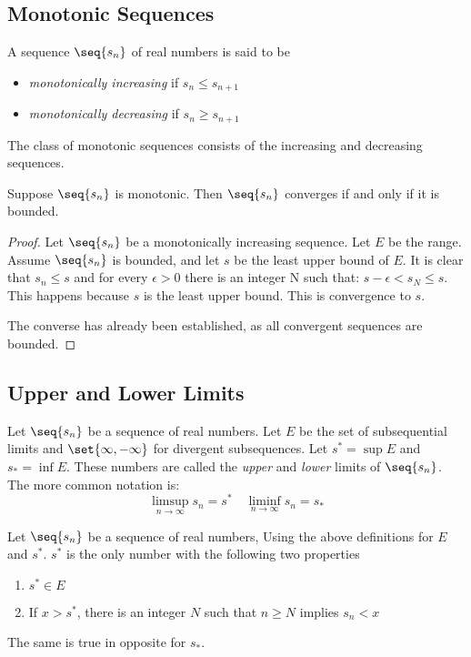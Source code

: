 \documentclass[12pt, letterpaper]{paper}
\begin{document}
\subsection{Monotonic Sequences}
\label{sec:org803e73d}

A sequence $\seq{s_n}$ of real numbers is said to be
\begin{itemize}
\item \emph{monotonically increasing} if $s_n \leq s_{n+1}$
\item \emph{monotonically decreasing} if $s_n \geq s_{n+1}$
\end{itemize}

The class of monotonic sequences consists of the increasing and
decreasing sequences.

\begin{theorem}
  \label{thr:3.14}
  Suppose $\seq{s_n}$ is monotonic. Then $\seq{s_n}$ converges if and
  only if it is bounded.
\end{theorem}
\begin{proof}
  Let $\seq{s_n}$ be a monotonically increasing sequence. Let $E$ be
  the range. Assume $\seq{s_n}$ is bounded, and let $s$ be the least
  upper bound of $E$. It is clear that $s_n \leq s$ and for every
  $\epsilon > 0$ there is an integer N such that:
  $s - \epsilon < s_N \leq s$. This happens because $s$ is the least
  upper bound. This is convergence to $s$.

  The converse has already been established, as all convergent
  sequences are bounded.
\end{proof}

\subsection{Upper and Lower Limits}
\label{sec:orgcc73cf4}
Let $\seq{s_n}$ be a sequence of real numbers. Let $E$ be the set of
subsequential limits and $\set{\infty, -\infty}$ for divergent
subsequences. Let $s^{*} = \sup{E}$ and $s_{*} = \inf{E}$. These
numbers are called the \emph{upper} and \emph{lower} limits of
$\seq{s_n}$. The more common notation is:
\begin{equation*}
  \limsup_{n\to \infty} s_n = s^{*} \quad \liminf_{n\to \infty} s_n = s_{*}
\end{equation*}

\begin{theorem}
  \label{thr:3.17}
  Let $\seq{s_n}$ be a sequence of real numbers, Using the above
  definitions for $E$ and $s^{*}$. $s^{*}$ is the only number with the
  following two properties
  \begin{enumerate}
  \item $s^{*} \in E$
  \item If $x > s^{*}$, there is an integer $N$ such that $n \geq N$
    implies $s_n < x$
  \end{enumerate}
  The same is true in opposite for $s_{*}$.
\end{theorem}
\end{document}
